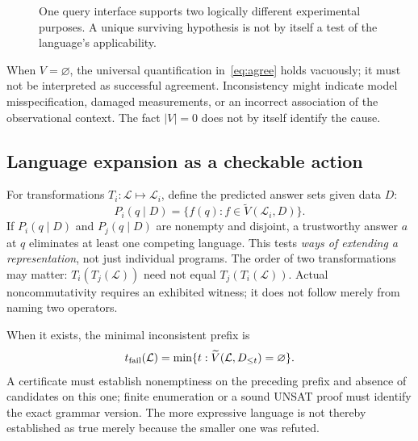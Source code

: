 \documentclass[11pt,a4paper]{article}
\newcommand{\VS}{\widetilde V}
\newcommand{\Agree}{\operatorname{Agree}}
\begin{document}
\begin{figure}[htbp]
\centering
{}
\caption{One query interface supports two logically different experimental purposes. A unique surviving hypothesis is not by itself a test of the language's applicability.}\label{fig:query}
\end{figure}

When $V=\varnothing$, the universal quantification in~\eqref{eq:agree} holds vacuously; it must not be interpreted as successful agreement. Inconsistency might indicate model misspecification, damaged measurements, or an incorrect association of the observational context. The fact $|V|=0$ does not by itself identify the cause.

\subsection{Language expansion as a checkable action}

For transformations $T_i:\mathcal L\mapsto\mathcal L_i$, define the predicted answer sets given data $D$:
\begin{equation}\label{eq:cross}
P_i(q\mid D)=\{f(q):f\in\VS(\mathcal L_i,D)\}.
\end{equation}
If $P_i(q\mid D)$ and $P_j(q\mid D)$ are nonempty and disjoint, a trustworthy answer $a$ at $q$ eliminates at least one competing language. This tests \emph{ways of extending a representation}, not just individual programs. The order of two transformations may matter: $T_i(T_j(\mathcal L))$ need not equal $T_j(T_i(\mathcal L))$. Actual noncommutativity requires an exhibited witness; it does not follow merely from naming two operators.

When it exists, the minimal inconsistent prefix is
\begin{equation}\label{eq:failprefix}
t_{\rm fail}(\mathcal L)=\min\{t:\VS(\mathcal L,D_{\le t})=\varnothing\}.
\end{equation}
A certificate must establish nonemptiness on the preceding prefix and absence of candidates on this one; finite enumeration or a sound UNSAT proof must identify the exact grammar version. The more expressive language is not thereby established as true merely because the smaller one was refuted.
\end{document}
